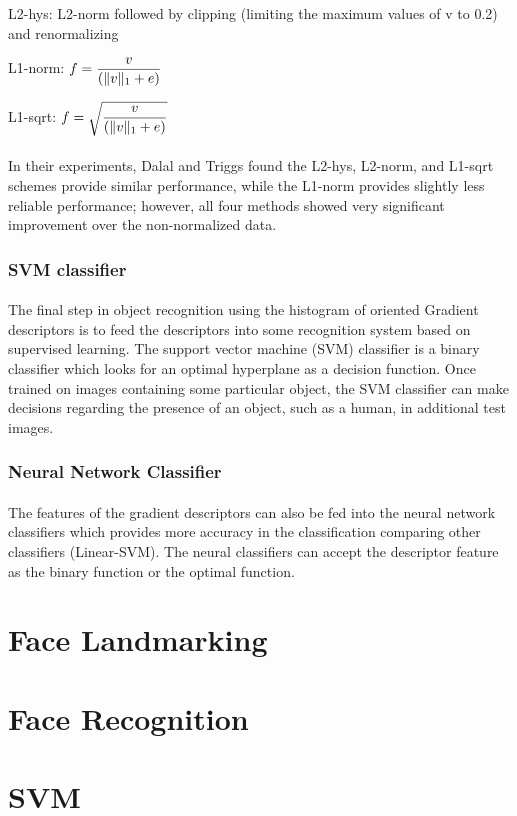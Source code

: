 		L2-hys: L2-norm followed by clipping (limiting the maximum values of v to 0.2) and renormalizing
		
		L1-norm: ${\displaystyle f={v \over (\|v\|_{1}+e)}}$
		
		L1-sqrt: ${\displaystyle f={\sqrt {v \over (\|v\|_{1}+e)}}}$
		
		\paragraph{}In their experiments, Dalal and Triggs found the L2-hys, L2-norm, and L1-sqrt schemes provide similar performance, while the L1-norm provides slightly less reliable performance; however, all four methods showed very significant improvement over the non-normalized data.
		
		\subsubsection{SVM classifier}
		\paragraph{}The final step in object recognition using the histogram of oriented Gradient descriptors is to feed the descriptors into some recognition system based on supervised learning. The support vector machine (SVM) classifier is a binary classifier which looks for an optimal hyperplane as a decision function. Once trained on images containing some particular object, the SVM classifier can make decisions regarding the presence of an object, such as a human, in additional test images.
		
		\subsubsection{Neural Network Classifier}
		\paragraph{}The features of the gradient descriptors can also be fed into the neural network classifiers which provides more accuracy in the classification comparing other classifiers (Linear-SVM). The neural classifiers can accept the descriptor feature as the binary function or the optimal function.
	
\section{Face Landmarking}

\section{Face Recognition}

\section{SVM}
